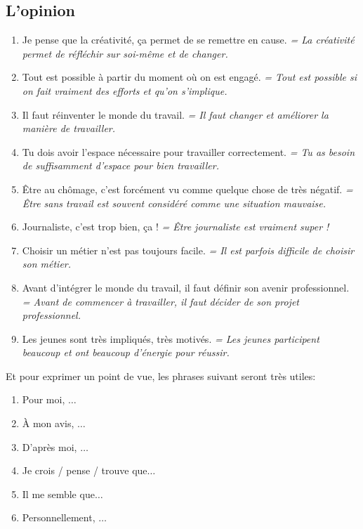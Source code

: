 \documentclass[math,code]{amznotes}
\theoremstyle{remark}
\begin{document}
\subsection*{L'opinion}

\begin{enumerate}
    \item Je pense que la créativité, ça permet de se remettre en cause. \textit{= La créativité permet de réfléchir sur soi-même et de changer.}
    
    \item Tout est possible à partir du moment où on est engagé. \textit{= Tout est possible si on fait vraiment des efforts et qu'on s'implique.}
    
    \item Il faut réinventer le monde du travail. \textit{= Il faut changer et améliorer la manière de travailler.}
    
    \item Tu dois avoir l'espace nécessaire pour travailler correctement. \textit{= Tu as besoin de suffisamment d'espace pour bien travailler.}
    
    \item Être au chômage, c'est forcément vu comme quelque chose de très négatif. \textit{= Être sans travail est souvent considéré comme une situation mauvaise.}
    
    \item Journaliste, c'est trop bien, ça ! \textit{= Être journaliste est vraiment super !}
    
    \item Choisir un métier n'est pas toujours facile. \textit{= Il est parfois difficile de choisir son métier.}
    
    \item Avant d'intégrer le monde du travail, il faut définir son avenir professionnel. \textit{= Avant de commencer à travailler, il faut décider de son projet professionnel.}
    
    \item Les jeunes sont très impliqués, très motivés. \textit{= Les jeunes participent beaucoup et ont beaucoup d'énergie pour réussir.}
\end{enumerate}

Et pour exprimer un point de vue, les phrases suivant seront très utiles:

\begin{enumerate}
    \item Pour moi, $\dots$
    \item À mon avis, $\dots$
    \item D'après moi, $\dots$
    \item Je crois / pense / trouve que$\dots$
    \item Il me semble que$\dots$
    \item Personnellement, $\dots$
\end{enumerate}
\end{document}
